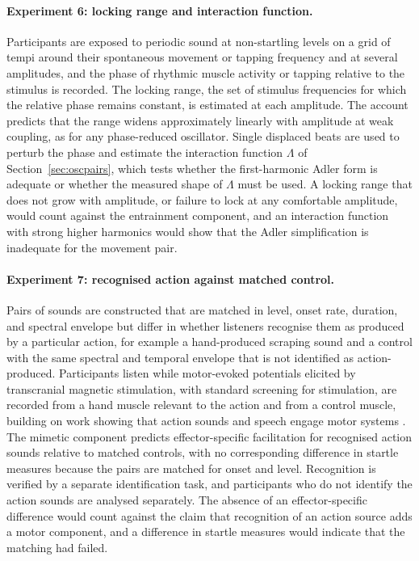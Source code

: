 \documentclass[11pt]{article}
\theoremstyle{plain}
\theoremstyle{definition}
\begin{document}
\paragraph{Experiment 6: locking range and interaction function.}
Participants are exposed to periodic sound at non-startling levels on a grid of tempi around their spontaneous movement or tapping frequency and at several amplitudes, and the phase of rhythmic muscle activity or tapping relative to the stimulus is recorded. The locking range, the set of stimulus frequencies for which the relative phase remains constant, is estimated at each amplitude. The account predicts that the range widens approximately linearly with amplitude at weak coupling, as for any phase-reduced oscillator. Single displaced beats are used to perturb the phase and estimate the interaction function $\Lambda$ of Section~\ref{sec:oscpairs}, which tests whether the first-harmonic Adler form is adequate or whether the measured shape of $\Lambda$ must be used. A locking range that does not grow with amplitude, or failure to lock at any comfortable amplitude, would count against the entrainment component, and an interaction function with strong higher harmonics would show that the Adler simplification is inadequate for the movement pair.

\paragraph{Experiment 7: recognised action against matched control.}
Pairs of sounds are constructed that are matched in level, onset rate, duration, and spectral envelope but differ in whether listeners recognise them as produced by a particular action, for example a hand-produced scraping sound and a control with the same spectral and temporal envelope that is not identified as action-produced. Participants listen while motor-evoked potentials elicited by transcranial magnetic stimulation, with standard screening for stimulation, are recorded from a hand muscle relevant to the action and from a control muscle, building on work showing that action sounds and speech engage motor systems \citep{fadiga2002,gazzola2006}. The mimetic component predicts effector-specific facilitation for recognised action sounds relative to matched controls, with no corresponding difference in startle measures because the pairs are matched for onset and level. Recognition is verified by a separate identification task, and participants who do not identify the action sounds are analysed separately. The absence of an effector-specific difference would count against the claim that recognition of an action source adds a motor component, and a difference in startle measures would indicate that the matching had failed.
\end{document}
